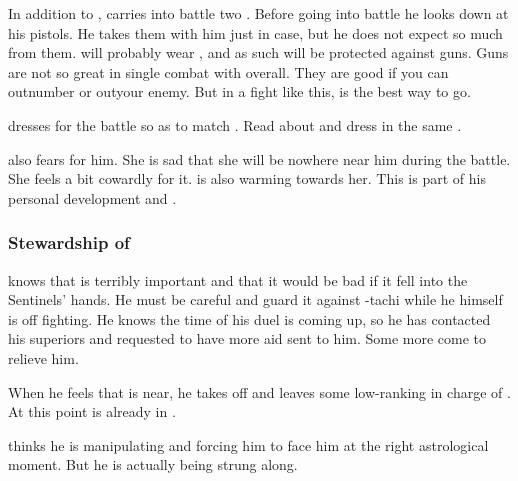 In addition to \Ossiraith, \Teshrial{} carries into battle two . 
Before going into battle he looks down at his pistols. 
He takes them with him just in case, but he does not expect so much from them. 
\Ishnaruchaefir{} will probably wear , and as such will be protected against guns. 
Guns are not so great in single combat with \dragons{} overall.
They are good if you can outnumber or out\manoeuvre your enemy. 
But in a fight like this, \melee{} is the best way to go. 

\Teshrial dresses for the battle so as to match \Ossiraith. 
Read about  and dress \Teshrial in the same \colour. 

\Urizeth also fears for him.
She is sad that she will be nowhere near him during the battle.
She feels a bit cowardly for it.
\Teshrial is also warming towards her.
This is part of his personal development and . 





\subsubsection{Stewardship of \Malcur}
\Teshrial{} knows that \Malcur is terribly important and that it would be bad if it fell into the Sentinels' hands. 
He must be careful and guard it against \Psyrex-tachi while he himself is off fighting. 
He knows the time of his duel is coming up, so he has contacted his superiors and requested to have more aid sent to him. 
Some more \resphain{} come to relieve him. 

When he feels that \Ishnaruchaefir{} is near, he takes off and leaves some low-ranking \resphain{} in charge of \Malcur. 
At this point \Achsah{} is already in \Forclin. 

\Teshrial{} thinks he is manipulating \Ishnaruchaefir{} and forcing him to face him at the right astrological moment. 
But he is actually being strung along. 


